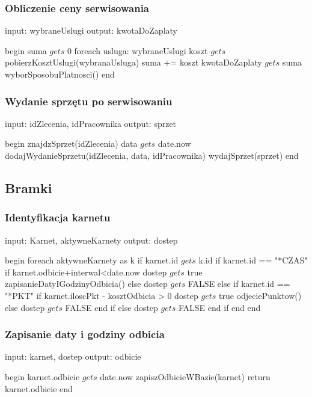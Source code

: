\subsubsection{Obliczenie ceny serwisowania}
\begin{algorithm}[caption={5.2 Obliczenie ceny serwisowania}, label={alg1}]
  input: wybraneUslugi
  output: kwotaDoZaplaty
  
begin
  suma $gets$ 0
  foreach usluga: wybraneUslugi
    koszt $gets$ pobierzKosztUslugi(wybranaUsluga)
    suma += koszt
  kwotaDoZaplaty $gets$ suma
  wyborSposobuPlatnosci()
end
\end{algorithm}

\subsubsection{Wydanie sprzętu po serwisowaniu}
\begin{algorithm}[caption={5.3 Wydanie sprzętu po serwisowaniu}, label={alg1}]
  input: idZlecenia, idPracownika
  output: sprzet
  
begin
  znajdzSprzet(idZlecenia)
  data $gets$ date.now
  dodajWydanieSprzetu(idZlecenia, data, idPracownika)
  wydajSprzet(sprzet)
end
\end{algorithm}

\subsection{Bramki}
\subsubsection{Identyfikacja karnetu}
\begin{algorithm}[caption={6.1 Identyfikacja karnetu}, label={alg1}]
  input: Karnet, aktywneKarnety
  output: dostep
  
begin
  foreach aktywneKarnety as k
    if karnet.id $gets$ k.id 
      if karnet.id == "*CZAS" 
        if karnet.odbicie+interwal<date.now 
          dostep $gets$ true
          zapisanieDatyIGodzinyOdbicia()
        else
          dostep $gets$ FALSE
      else if karnet.id == "*PKT" 
        if karnet.iloscPkt - kosztOdbicia > 0 
          dostep $gets$ true
          odjeciePunktow()
        else
          dostep $gets$ FALSE
      end if
    else
      dostep $gets$ FALSE
    end if
  end
end

\end{algorithm}

\subsubsection{Zapisanie daty i godziny odbicia}
\begin{algorithm}[caption={6.2 Zapisanie daty i godziny odbicia}, label={alg1}]
  input: karnet, dostep
  output: odbicie
  
begin
  karnet.odbicie $gets$ date.now
  zapiszOdbicieWBazie(karnet)
  return karnet.odbicie
end
\end{algorithm}

